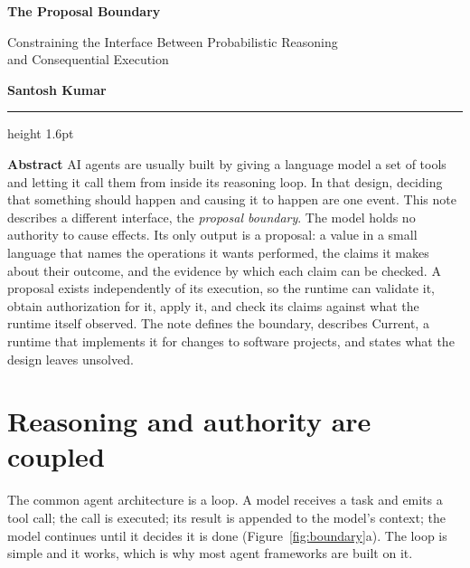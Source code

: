 \documentclass[10pt,letterpaper]{article}
\begin{document}
{\sffamily
{\fontsize{23}{27}\selectfont\bfseries The Proposal Boundary\par}
\vspace{0.5em}
{\fontsize{12.5}{16}\selectfont Constraining the Interface Between Probabilistic Reasoning\\
and Consequential Execution\par}
\vspace{1.1em}
{\fontsize{10}{13}\selectfont \textbf{Santosh Kumar}\par}
}
\vspace{0.9em}
{\color{accent}\hrule height 1.6pt}
\vspace{1.0em}

{\sffamily\bfseries\small Abstract}\hspace{0.6em}%
AI agents are usually built by giving a language model a set of tools and letting it call them
from inside its reasoning loop. In that design, deciding that something should happen and
causing it to happen are one event. This note describes a different interface, the
\emph{proposal boundary}. The model holds no authority to cause effects. Its only output is a
proposal: a value in a small language that names the operations it wants performed, the claims
it makes about their outcome, and the evidence by which each claim can be checked. A proposal
exists independently of its execution, so the runtime can validate it, obtain
authorization for it, apply it, and check its claims against what the runtime itself observed.
The note defines the boundary, describes Current, a runtime that implements it for changes to
software projects, and states what the design leaves unsolved.

\section{Reasoning and authority are coupled}

The common agent architecture is a loop. A model receives a task and emits a tool call; the
call is executed; its result is appended to the model's context; the model continues until it
decides it is done (Figure~\ref{fig:boundary}a). The loop is simple and it works, which is why
most agent frameworks are built on it.
\end{document}
